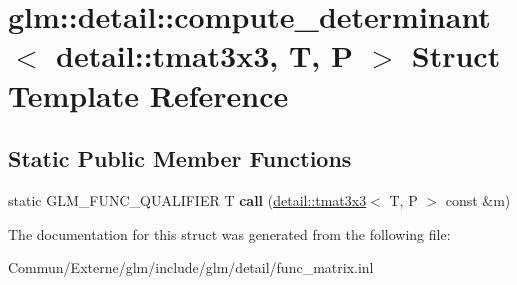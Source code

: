 \hypertarget{structglm_1_1detail_1_1compute__determinant_3_01detail_1_1tmat3x3_00_01_t_00_01_p_01_4}{}\section{glm\+:\+:detail\+:\+:compute\+\_\+determinant$<$ detail\+:\+:tmat3x3, T, P $>$ Struct Template Reference}
\label{structglm_1_1detail_1_1compute__determinant_3_01detail_1_1tmat3x3_00_01_t_00_01_p_01_4}
\subsection*{Static Public Member Functions}
\begin{DoxyCompactItemize}
\item 
static G\+L\+M\+\_\+\+F\+U\+N\+C\+\_\+\+Q\+U\+A\+L\+I\+F\+I\+ER T {\bfseries call} (\hyperlink{structglm_1_1detail_1_1tmat3x3}{detail\+::tmat3x3}$<$ T, P $>$ const \&m)\hypertarget{structglm_1_1detail_1_1compute__determinant_3_01detail_1_1tmat3x3_00_01_t_00_01_p_01_4_aacdeab0c051558a445f3f674dd6a5e8b}{}\label{structglm_1_1detail_1_1compute__determinant_3_01detail_1_1tmat3x3_00_01_t_00_01_p_01_4_aacdeab0c051558a445f3f674dd6a5e8b}

\end{DoxyCompactItemize}


The documentation for this struct was generated from the following file\+:\begin{DoxyCompactItemize}
\item 
Commun/\+Externe/glm/include/glm/detail/func\+\_\+matrix.\+inl\end{DoxyCompactItemize}
